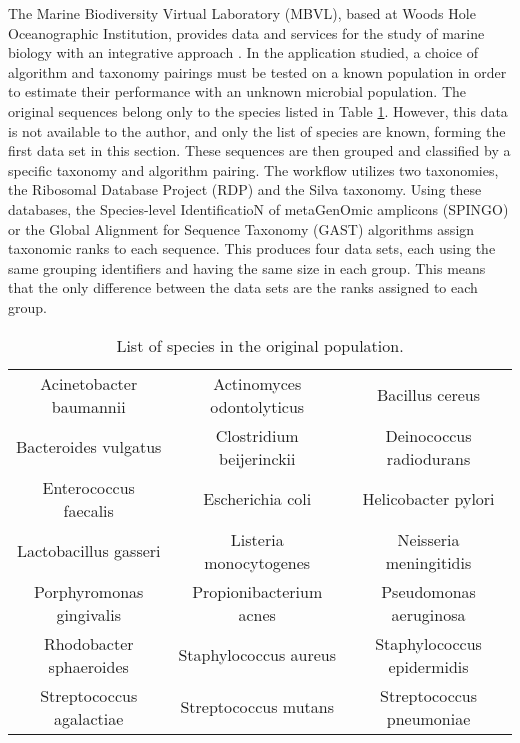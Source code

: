 The Marine Biodiversity Virtual Laboratory (MBVL), based at Woods Hole Oceanographic Institution, provides data and services for the study of marine biology with an integrative approach \cite{mbvl}.
In the application studied, a choice of algorithm and taxonomy pairings must be tested on a known population in order to estimate their performance with an unknown microbial population.
The original sequences belong only to the species listed in Table \ref{species_table}.
However, this data is not available to the author, and only the list of species are known, forming the first data set in this section.
These sequences are then grouped and classified by a specific taxonomy and algorithm pairing.
The workflow utilizes two taxonomies, the Ribosomal Database Project (RDP) and the Silva taxonomy.
Using these databases, the Species-level IdentificatioN of metaGenOmic amplicons (SPINGO) or the Global Alignment for Sequence Taxonomy (GAST) algorithms assign taxonomic ranks to each sequence.
This produces four data sets, each using the same grouping identifiers and having the same size in each group.
This means that the only difference between the data sets are the ranks assigned to each group.

\begin{table}
	\caption{List of species in the original population.}
	\label{species_table}
	\centering
	\setlength{\tabcolsep}{2pt}
	\begin{tabular}{|c|c|c|}
			\hline
			Acinetobacter baumannii & Actinomyces odontolyticus & Bacillus cereus \\
			Bacteroides vulgatus & Clostridium beijerinckii & Deinococcus radiodurans \\
			Enterococcus faecalis & Escherichia coli & Helicobacter pylori \\
			Lactobacillus gasseri & Listeria monocytogenes & Neisseria meningitidis\\
			Porphyromonas gingivalis & Propionibacterium acnes & Pseudomonas aeruginosa \\
			Rhodobacter sphaeroides & Staphylococcus aureus & Staphylococcus epidermidis\\
			Streptococcus agalactiae & Streptococcus mutans & Streptococcus pneumoniae \\
			\hline
	\end{tabular}
\end{table}
